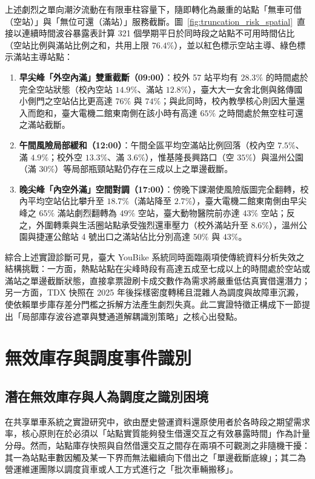 上述劇烈之單向潮汐流動在有限車柱容量下，隨即轉化為嚴重的站點「無車可借（空站）」與「無位可還（滿站）」服務截斷。圖~\ref{fig:truncation_risk_spatial}~直接以連續時間波谷暴露表計算 321 個學期平日於同時段之站點不可用時間佔比（空站比例與滿站比例之和，共用上限 $76.4\%$），並以紅色標示空站主導、綠色標示滿站主導站點：

\begin{enumerate}[label = \textbullet]
    \item \textbf{早尖峰「外空內滿」雙重截斷（09:00）}：校外 57 站平均有 $28.3\%$ 的時間處於完全空站狀態（校內空站 $14.9\%$、滿站 $12.8\%$），臺大大一女舍北側與銘傳國小側門之空站佔比更高達 $76\%$ 與 $74\%$；與此同時，校內教學核心則因大量還入而飽和，臺大電機二館東南側在該小時有高達 $65\%$ 之時間處於無空柱可還之滿站截斷。
    \item \textbf{午間風險局部緩和（12:00）}：午間全區平均空滿站比例回落（校內空 $7.5\%$、滿 $4.9\%$；校外空 $13.3\%$、滿 $3.6\%$），惟基隆長興路口（空 $35\%$）與溫州公園（滿 $30\%$）等局部瓶頸站點仍存在三成以上之單邊截斷。
    \item \textbf{晚尖峰「內空外滿」空間對調（17:00）}：傍晚下課潮使風險版圖完全翻轉，校內平均空站佔比攀升至 $18.7\%$（滿站降至 $2.7\%$），臺大電機二館東南側由早尖峰之 $65\%$ 滿站劇烈翻轉為 $49\%$ 空站，臺大動物醫院前亦達 $43\%$ 空站；反之，外圍轉乘與生活圈站點承受強烈還車壓力（校外滿站升至 $8.6\%$），溫州公園與捷運公館站 4 號出口之滿站佔比分別高達 $50\%$ 與 $43\%$。
\end{enumerate}

綜合上述實證診斷可見，臺大 YouBike 系統同時面臨兩項使傳統資料分析失效之結構挑戰：一方面，熱點站點在尖峰時段有高達五成至七成以上的時間處於空站或滿站之單邊截斷狀態，直接拿票證刷卡成交數作為需求將嚴重低估真實借還潛力；另一方面，TDX 快照在 2025 年後採樣密度轉稀且混雜人為調度與故障車沉澱，使依賴單步庫存差分門檻之拆解方法產生劇烈失真。此二實證特徵正構成下一節提出「局部庫存波谷遮罩與雙通道解耦識別策略」之核心出發點。

\section{無效庫存與調度事件識別}\label{sec:latent_demand_identification}

\subsection{潛在無效庫存與人為調度之識別困境}

在共享單車系統之實證研究中，欲由歷史營運資料還原使用者於各時段之期望需求率，核心原則在於必須以「站點實質能夠發生借還交互之有效暴露時間」作為計量分母。然而，站點庫存快照與自然借還交互之間存在兩項不可觀測之非隨機干擾：其一為站點車數因觸及某一下界而無法繼續向下借出之「單邊截斷底線」；其二為營運維運團隊以調度貨車或人工方式進行之「批次車輛搬移」。

